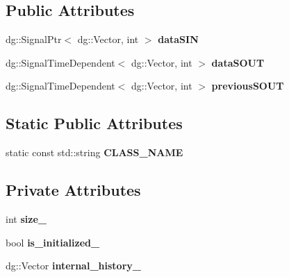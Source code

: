 \subsection*{Public Attributes}
\begin{DoxyCompactItemize}
\item 
dg\+::\+Signal\+Ptr$<$ dg\+::\+Vector, int $>$ {\bfseries data\+S\+IN}\hypertarget{classdg__tools_1_1PreviousValue_a937b59c8319a7facb7289eff6235f0a1}{}\label{classdg__tools_1_1PreviousValue_a937b59c8319a7facb7289eff6235f0a1}

\item 
dg\+::\+Signal\+Time\+Dependent$<$ dg\+::\+Vector, int $>$ {\bfseries data\+S\+O\+UT}\hypertarget{classdg__tools_1_1PreviousValue_a655e7f859fcf867524ff51d319612b81}{}\label{classdg__tools_1_1PreviousValue_a655e7f859fcf867524ff51d319612b81}

\item 
dg\+::\+Signal\+Time\+Dependent$<$ dg\+::\+Vector, int $>$ {\bfseries previous\+S\+O\+UT}\hypertarget{classdg__tools_1_1PreviousValue_a5c76ee891d5ca88769a8b681f8c10bcc}{}\label{classdg__tools_1_1PreviousValue_a5c76ee891d5ca88769a8b681f8c10bcc}

\end{DoxyCompactItemize}
\subsection*{Static Public Attributes}
\begin{DoxyCompactItemize}
\item 
static const std\+::string {\bfseries C\+L\+A\+S\+S\+\_\+\+N\+A\+ME}\hypertarget{classdg__tools_1_1PreviousValue_ae1bcc71c1bdae70ad54f4ba7aa741a6e}{}\label{classdg__tools_1_1PreviousValue_ae1bcc71c1bdae70ad54f4ba7aa741a6e}

\end{DoxyCompactItemize}
\subsection*{Private Attributes}
\begin{DoxyCompactItemize}
\item 
int {\bfseries size\+\_\+}\hypertarget{classdg__tools_1_1PreviousValue_a343c9292b3dd5f53a02da9c1ebe70cab}{}\label{classdg__tools_1_1PreviousValue_a343c9292b3dd5f53a02da9c1ebe70cab}

\item 
bool {\bfseries is\+\_\+initialized\+\_\+}\hypertarget{classdg__tools_1_1PreviousValue_aa972a5500930267a6fd84c5570254c22}{}\label{classdg__tools_1_1PreviousValue_aa972a5500930267a6fd84c5570254c22}

\item 
dg\+::\+Vector {\bfseries internal\+\_\+history\+\_\+}\hypertarget{classdg__tools_1_1PreviousValue_aae52a34a0b2e5a8049efb66dc1b80439}{}\label{classdg__tools_1_1PreviousValue_aae52a34a0b2e5a8049efb66dc1b80439}

\end{DoxyCompactItemize}


